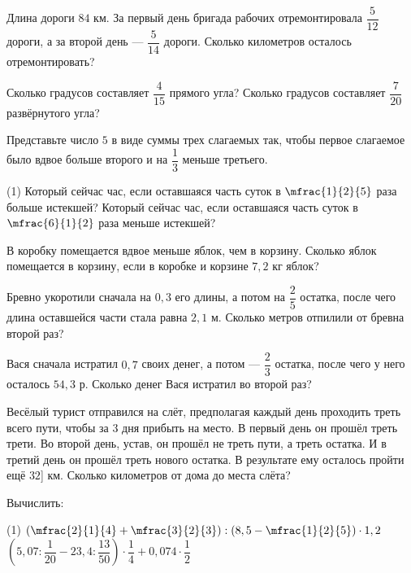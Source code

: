
%
%
\begin{class}[number=6]
	\begin{listofex}
		\item Длина дороги \(84\) км. За первый день бригада рабочих отремонтировала \(\dfrac{5}{12}\) дороги, а за второй день --- \(\dfrac{5}{14}\) дороги. Сколько километров осталось отремонтировать?
		\item Сколько градусов составляет \(\dfrac{4}{15}\) прямого угла? Сколько градусов составляет \(\dfrac{7}{20}\) развёрнутого угла?
		\item Представьте число \(5\) в виде суммы трех слагаемых так, чтобы первое слагаемое было вдвое больше второго и на \(\dfrac{1}{3}\) меньше третьего.
		\begin{tasks}(1)
			\task Который сейчас час, если оставшаяся часть суток в \(\mfrac{1}{2}{5}\) раза больше истекшей?
			\task Который сейчас час, если оставшаяся часть суток в \(\mfrac{6}{1}{2}\) раза меньше истекшей?
		\end{tasks}
		\item В коробку помещается вдвое меньше яблок, чем в корзину. Сколько яблок помещается в корзину, если в коробке и корзине \(7,2\) кг яблок?
		\item Бревно укоротили сначала на \(0,3\) его длины, а потом на \(\dfrac{2}{5}\)  остатка, после чего длина оставшейся части стала равна \(2,1\) м. Сколько метров отпилили от бревна второй раз?
		\item Вася сначала истратил \(0,7\) своих денег, а потом --- \(\dfrac{2}{3}\) остатка, после чего у него осталось \(54,3\) р. Сколько денег Вася истратил во второй раз?
		\item Весёлый турист отправился на слёт, предполагая каждый день проходить треть всего пути, чтобы за \(3\) дня прибыть на место. В первый день он прошёл треть трети. Во второй день, устав, он прошёл не треть пути, а треть остатка. И в третий день он прошёл треть нового остатка. В результате ему осталось пройти ещё \(32\)] км. Сколько километров от дома до места слёта?
		\item Вычислить:
		\begin{tasks}(1)
			\task \(\left(\mfrac{2}{1}{4}+\mfrac{3}{2}{3}\right):\left(8,5-\mfrac{1}{2}{5}\right) \cdot 1,2\)
			\task \(\left(5,07:\dfrac{1}{20}-23,4: \dfrac{13}{50}\right) \cdot \dfrac{1}{4} + 0,074 \cdot \dfrac{1}{2}\)
		\end{tasks}
	\end{listofex}
\end{class}

